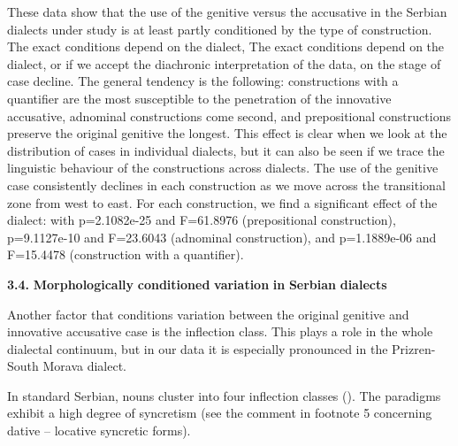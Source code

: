 \documentclass[output=paper]{langscibook}
\begin{document}
These data show that the use of the genitive versus the accusative in the Serbian dialects under study is at least partly conditioned by the type of construction. The exact conditions depend on the dialect, The exact conditions depend on the dialect, or if we accept the diachronic interpretation of the data, on the stage of case decline. The general tendency is the following:  constructions with a quantifier are the most susceptible to the penetration of the innovative accusative, adnominal constructions come second, and prepositional constructions preserve the original genitive the longest. This effect is clear when we look at the distribution of cases in individual dialects, but it can also be seen if we trace the linguistic behaviour of the constructions across dialects. The use of the genitive case consistently declines in each construction as we move across the transitional zone from west to east. For each construction, we find a significant effect of the dialect: with p=2.1082e-25 and F=61.8976 (prepositional construction), p=9.1127e-10 and F=23.6043 (adnominal construction), and p=1.1889e-06 and F=15.4478 (construction with a quantifier).

\textbf{3.4.} \textbf{Morphologically} \textbf{conditioned} \textbf{variation} \textbf{in} \textbf{Serbian} \textbf{dialects}

Another factor that conditions variation between the original genitive and innovative accusative case is the inflection class.  This plays a role in the whole dialectal continuum, but in our data it is especially pronounced in the Prizren-South Morava dialect. 

In standard Serbian, nouns cluster into four inflection classes (). The paradigms exhibit a high degree of syncretism (see the comment in footnote 5 concerning dative – locative syncretic forms).
\end{document}
